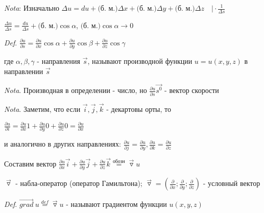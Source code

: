 \documentclass[12pt]{article}
\begin{document}
    \vspace{3mm}
\textit{Nota}: Изначально $\displaystyle \Delta u = du + \text{(б. м.)} \Delta x + \text{(б. м.)} \Delta y + \text{(б. м.)} \Delta z \quad \Big| \cdot \frac{1}{\Delta s}$

    $\displaystyle \frac{\Delta u}{\Delta s} = \frac{du}{\Delta s} + \text{(б. м.)} \cos\alpha$, $\text{(б. м.)} \cos\alpha \rightarrow 0$

    \vspace{3mm}
\textit{Def}. $\displaystyle \frac{\partial u}{\partial s} = \frac{\partial u}{\partial x} \cos\alpha + \frac{\partial u}{\partial y} \cos\beta + \frac{\partial u}{\partial z} \cos\gamma$

    где $\alpha, \beta, \gamma$ - направления $\overrightarrow{s}$, называют производной функции $u = u(x, y, z)$ в направлении $\overrightarrow{s}$

    \vspace{3mm}
\textit{Nota}. Производная в определении - число, но $\displaystyle \frac{\partial u}{\partial s} \overrightarrow{s^0}$ - вектор скорости

    \vspace{3mm}
\textit{Nota}. Заметим, что если $\overrightarrow{i}, \overrightarrow{j}, \overrightarrow{k}$ - декартовы орты, то

    $\displaystyle \frac{\partial u}{\partial i} = \frac{\partial u}{\partial x} 1 + \frac{\partial u}{\partial y} 0 + \frac{\partial u}{\partial z} 0 = \frac{\partial u}{\partial x}$

    и аналогично в других направлениях: $\displaystyle \frac{\partial u}{\partial j} = \frac{\partial u}{\partial y}, \frac{\partial u}{\partial k} = \frac{\partial u}{\partial z}$

    Составим вектор $\displaystyle \frac{\partial u}{\partial x} \overrightarrow{i} + \frac{\partial u}{\partial y} \overrightarrow{j} + \frac{\partial u}{\partial z} \overrightarrow{k} \stackrel{\text{обозн}}{=} \overrightarrow{\triangledown} u$

    $\overrightarrow{\triangledown}$ - набла-оператор (оператор Гамильтона); $\displaystyle \overrightarrow{\triangledown} = (\frac{\partial}{\partial x}; \frac{\partial}{\partial y}; \frac{\partial}{\partial z})$ - условный вектор

    \vspace{3mm}
\textit{Def}. $\overrightarrow{grad} \ u \stackrel{def}{=} \overrightarrow{\triangledown} u$ - называют градиентом функции $u(x, y, z)$
\end{document}
